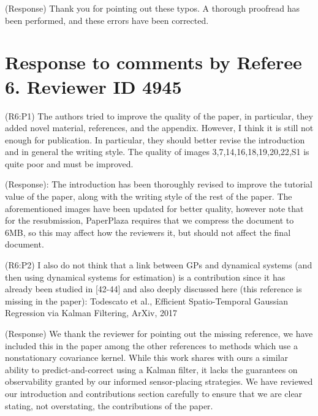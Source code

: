 \documentclass{letter}
\begin{document}
{\color{red}(Response)} Thank you for pointing out these typos. A thorough proofread has been performed, and these errors have been corrected.



\section{Response to comments by Referee 6. Reviewer ID 4945}

{\color{red}(R6:P1)} The authors tried to improve the quality of the paper, in particular, they added novel material, references, and the appendix. However, I think it is still not enough for publication. In particular, they should better revise the introduction and in general the writing style. The quality of images 3,7,14,16,18,19,20,22,S1 is quite poor and must be improved. 

{\color{red}(Response)}: The introduction has been thoroughly revised to improve the tutorial value of the paper, along with the writing style of the rest of the paper. The aforementioned images have been updated for better quality, however note that for the resubmission, PaperPlaza requires that we compress the document to 6MB, so this may affect how the reviewers it, but should not affect the final document.


{\color{red}(R6:P2)} I also do not think that a link between GPs and dynamical systems (and then using dynamical systems for estimation) is a contribution since it has already been studied in [42-44] and also deeply discussed here (this reference is missing in the paper): Todescato et al., Efficient Spatio-Temporal Gaussian Regression via Kalman Filtering, ArXiv, 2017

{\color{red}(Response)} We thank the reviewer for pointing out the missing reference, we have included this in the paper among the other references to methods which use a nonstationary covariance kernel. While this work shares with ours a similar ability to predict-and-correct using a Kalman filter, it lacks the guarantees on observability granted by our informed sensor-placing strategies. We have reviewed our introduction and contributions section carefully to ensure that we are clear stating, not overstating, the contributions of the paper.
\end{document}
